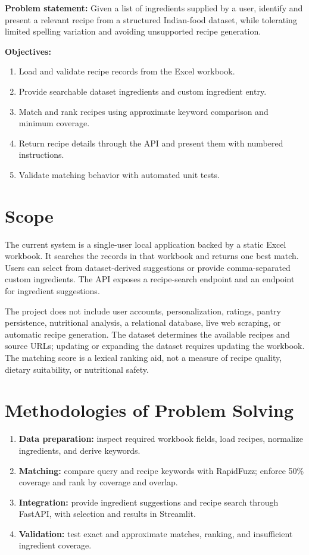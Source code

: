 \documentclass[12pt,a4paper]{report}
\begin{document}
\textbf{Problem statement:} Given a list of ingredients supplied by a user, identify and present a relevant recipe from a structured Indian-food dataset, while tolerating limited spelling variation and avoiding unsupported recipe generation.

\textbf{Objectives:}
\begin{enumerate}
  \item Load and validate recipe records from the Excel workbook.
  \item Provide searchable dataset ingredients and custom ingredient entry.
  \item Match and rank recipes using approximate keyword comparison and minimum coverage.
  \item Return recipe details through the API and present them with numbered instructions.
  \item Validate matching behavior with automated unit tests.
\end{enumerate}

\section{Scope}
\label{sec:intro_scope}

The current system is a single-user local application backed by a static Excel workbook. It searches the records in that workbook and returns one best match. Users can select from dataset-derived suggestions or provide comma-separated custom ingredients. The API exposes a recipe-search endpoint and an endpoint for ingredient suggestions.

The project does not include user accounts, personalization, ratings, pantry persistence, nutritional analysis, a relational database, live web scraping, or automatic recipe generation. The dataset determines the available recipes and source URLs; updating or expanding the dataset requires updating the workbook. The matching score is a lexical ranking aid, not a measure of recipe quality, dietary suitability, or nutritional safety.

\section{Methodologies of Problem Solving}
\label{sec:intro_methodology}

\begin{enumerate}
  \item \textbf{Data preparation:} inspect required workbook fields, load recipes, normalize ingredients, and derive keywords.
  \item \textbf{Matching:} compare query and recipe keywords with RapidFuzz; enforce 50\% coverage and rank by coverage and overlap.
  \item \textbf{Integration:} provide ingredient suggestions and recipe search through FastAPI, with selection and results in Streamlit.
  \item \textbf{Validation:} test exact and approximate matches, ranking, and insufficient ingredient coverage.
\end{enumerate}
\end{document}
